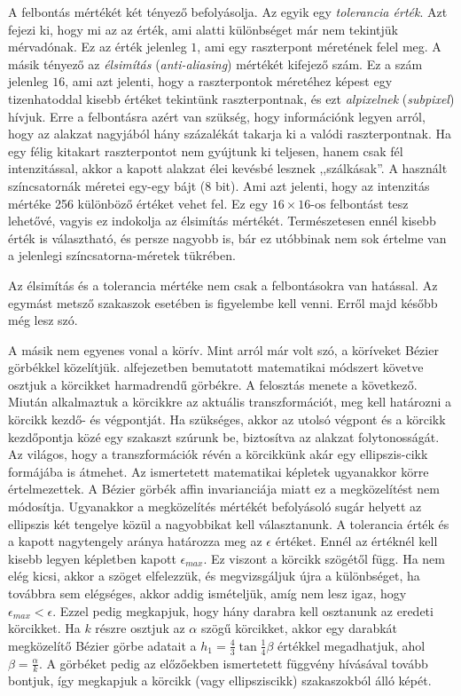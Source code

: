 \documentclass[12pt]{report}
\theoremstyle{definition}
\newcommand{\inenglish}[1]{\textsl{#1}}
\begin{document}
A felbontás mértékét két tényező befolyásolja. Az egyik egy \emph{tolerancia
érték}. Azt fejezi ki, hogy mi az az érték, ami alatti különbséget már nem
tekintjük mérvadónak. Ez az érték jelenleg $1$, ami egy raszterpont méretének
felel meg. A másik tényező az \emph{élsimítás} (\inenglish{anti-aliasing})
mértékét kifejező szám. Ez a szám jelenleg $16$, ami azt jelenti, hogy a
raszterpontok méretéhez képest egy tizenhatoddal kisebb értéket tekintünk
raszterpontnak, és ezt \emph{alpixelnek} (\inenglish{subpixel}) hívjuk. Erre a
felbontásra azért van szükség, hogy információnk legyen arról, hogy az alakzat
nagyjából hány százalékát takarja ki a valódi raszterpontnak. Ha egy félig
kitakart raszterpontot nem gyújtunk ki teljesen, hanem csak fél intenzitással,
akkor a kapott alakzat élei kevésbé lesznek ,,szálkásak''. A használt
színcsatornák méretei egy-egy bájt ($8$ bit). Ami azt jelenti, hogy az
intenzitás mértéke 256 különböző értéket vehet fel. Ez egy $16\times16$-os
felbontást tesz lehetővé, vagyis ez indokolja az élsimítás mértékét.
Természetesen ennél kisebb érték is választható, és persze nagyobb is, bár ez
utóbbinak nem sok értelme van a jelenlegi színcsatorna-méretek tükrében.

Az élsimítás és a tolerancia mértéke nem csak a felbontásokra van hatással. Az
egymást metsző szakaszok esetében is figyelembe kell venni. Erről majd később
még lesz szó.

A másik nem egyenes vonal a körív. Mint arról már volt szó, a köríveket Bézier
görbékkel közelítjük.  alfejezetben bemutatott matematikai
módszert követve osztjuk a körcikket harmadrendű görbékre. A felosztás menete a
következő. Miután alkalmaztuk a körcikkre az aktuális transzformációt, meg kell
határozni a körcikk kezdő- és végpontját. Ha szükséges, akkor az utolsó végpont
és a körcikk kezdőpontja közé egy szakaszt szúrunk be, biztosítva az alakzat
folytonosságát. Az világos, hogy a transzformációk révén a körcikkünk akár egy
ellipszis-cikk formájába is átmehet. Az ismertetett matematikai képletek
ugyanakkor körre értelmezettek. A Bézier görbék affin invarianciája miatt ez a
megközelítést nem módosítja. Ugyanakkor a megközelítés mértékét befolyásoló
sugár helyett az ellipszis két tengelye közül a nagyobbikat kell választanunk. A
tolerancia érték és a kapott nagytengely aránya határozza meg az $\epsilon$
értéket. Ennél az értéknél kell kisebb legyen  képletben kapott
$\epsilon_{max}$. Ez viszont a körcikk szögétől függ. Ha nem elég kicsi, akkor a
szöget elfelezzük, és megvizsgáljuk újra a különbséget, ha továbbra sem
elégséges, akkor addig ismételjük, amíg nem lesz igaz, hogy $\epsilon_{max} <
\epsilon$. Ezzel pedig megkapjuk, hogy hány darabra kell osztanunk az eredeti
körcikket. Ha $k$ részre osztjuk az $\alpha$ szögű körcikket, akkor egy darabkát
megközelítő Bézier görbe adatait a $h_1 = \frac{4}{3} \tan{\frac{1}{4} \beta}$
értékkel megadhatjuk, ahol $\beta = \frac{\alpha}{k}$. A görbéket pedig az
előzőekben ismertetett függvény hívásával tovább bontjuk, így megkapjuk a
körcikk (vagy ellipsziscikk) szakaszokból álló képét.
\end{document}
